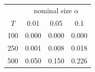 % 
\begin{tabular}{cccc}
  \hline
  & \multicolumn{3}{c}{nominal size $\alpha$} \\
 $T$ & 0.01 & 0.05 & 0.1 \\
 \hline
100 & 0.000 & 0.000 & 0.000 \\ 
  250 & 0.001 & 0.008 & 0.018 \\ 
  500 & 0.050 & 0.150 & 0.226 \\ 
   \hline
\end{tabular}
